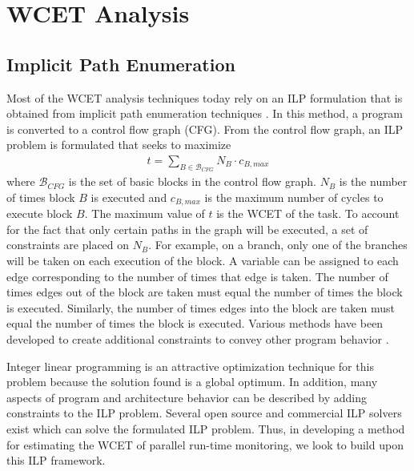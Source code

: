 \section{WCET Analysis}
\label{sec:monitoring_wcet.wcet}

\subsection{Implicit Path Enumeration}
\label{sec:formulation:ipet}

Most of the WCET analysis techniques today rely on an ILP formulation that is 
obtained from implicit path enumeration techniques \cite{li-ipet-dac95}. 
In this method, a program is converted to a control flow
graph (CFG). From the control flow graph, an ILP problem is formulated that
seeks to maximize
\begin{align*}
  t = \sum_{B \in \mathcal{B}_{CFG}}{N_B \cdot c_{B,max}}
\end{align*} 
where $\mathcal{B}_{CFG}$ is the set of basic blocks in the control flow graph. $N_{B}$
is the number of times block $B$ is executed and $c_{B,max}$ is the maximum number of cycles
to execute block $B$. The maximum value of $t$ is the WCET of the task.  To
account for the fact that only certain paths in the graph will be executed, a
set of constraints are placed on $N_{B}$. For example, on a branch, only one of
the branches will be taken on each execution
of the block. A variable can be assigned to each edge corresponding to the
number of times that edge is taken.
The number of times edges out of the block are taken must equal the number of
times the block is executed.
 Similarly,
the number of times edges into the block are taken must equal the number of
times the block is executed. Various methods have been developed to
create additional constraints to convey other program behavior \cite{li-ipet-dac95, wcetsurvey-tecs08}.

Integer linear programming is an attractive optimization technique
for this problem because the solution found is a global optimum. In
addition, many aspects of program and architecture behavior can be described by
adding constraints to the ILP problem. 
Several open source and commercial ILP solvers exist which can solve the formulated ILP problem.
Thus, in developing a method for
estimating the WCET of parallel run-time monitoring, we look to build upon this
ILP framework.

